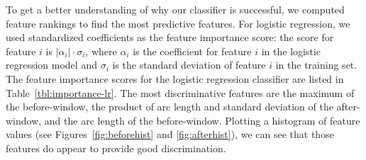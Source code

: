 



To get a better understanding of why our classifier is successful,
we computed feature rankings to find the most predictive features.
For logistic regression, we used standardized coefficients as the feature importance score:
the score for feature $i$ is $|\alpha_i| \cdot \sigma_i$, where $\alpha_i$ is the coefficient for feature $i$ in the logistic regression model and $\sigma_i$ is the standard deviation of feature $i$ in the training set.
The feature importance scores for the logistic regression classifier are listed in Table~\ref{tbl:importance-lr}.
The most discriminative features are
the maximum of the before-window,
the product of arc length and standard deviation of the after-window,
and the arc length of the before-window.
Plotting a histogram of feature values (see Figures~\ref{fig:beforehist} and \ref{fig:afterhist}), we can see that those features do appear to provide good discrimination.


